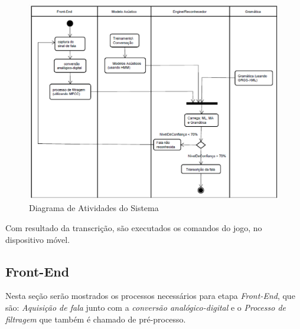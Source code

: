 \begin{figure}[H]
\includegraphics[width=1\textwidth]{graficos/desenvolvimento_rav.eps}
\caption{Diagrama de Atividades do Sistema}
\label{figArqRav}
\end{figure}

Com resultado da transcrição, são executados os comandos do jogo, no dispositivo móvel.

\subsection{Front-End}
Nesta seção serão mostrados os processos necessários para etapa \textit{Front-End}, que são: \textit{Aquisição de fala} junto com a \textit{conversão analógico-digital} e o \textit{Processo de filtragem} que também é chamado de pré-processo.

